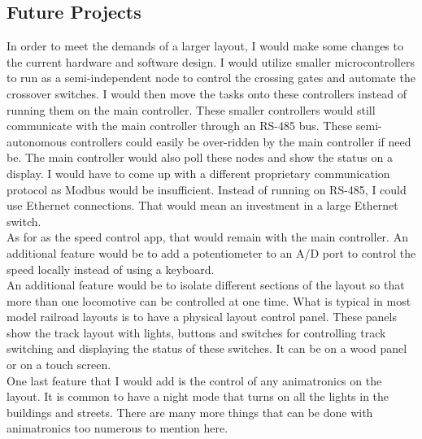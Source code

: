 \documentclass[acmlarge,screen]{acmart}
\begin{document}
\subsection{Future Projects}
In order to meet the demands of a larger layout, I would make some changes to the current hardware and software design. I would utilize smaller microcontrollers to run as a semi-independent node to control the crossing gates and automate the crossover switches. I would then move the tasks onto these controllers instead of running them on the main controller. These smaller controllers would still communicate with the main controller through an RS-485 bus. These semi-autonomous controllers could easily be over-ridden by the main controller if need be. The main controller would also poll these nodes and show the status on a display. I would have to come up with a different proprietary communication protocol as Modbus would be insufficient. Instead of running on RS-485, I could use Ethernet connections. That would mean an investment in a large Ethernet switch.\\
As for as the speed control app, that would remain with the main controller. An additional feature would be to add a potentiometer to an A/D port to control the speed locally instead of using a keyboard.\\
An additional feature would be to isolate different sections of the layout so that more than one locomotive can be controlled at one time. What is typical in most model railroad layouts is to have a physical layout control panel. These panels show the track layout with lights, buttons and switches for controlling track switching and displaying the status of these switches. It can be on a wood panel or on a touch screen.\\
One last feature that I would add is the control of any animatronics on the layout. It is common to have a night mode that turns on all the lights in the buildings and streets. There are many more things that can be done with animatronics too numerous to mention here.
\end{document}
